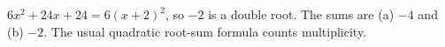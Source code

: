 $6x^2+24x+24=6(x+2)^2$, so $-2$ is a double root. The sums are (a) $\boxed{-4}$ and (b) $\boxed{-2}$. The usual quadratic root-sum formula counts multiplicity.
